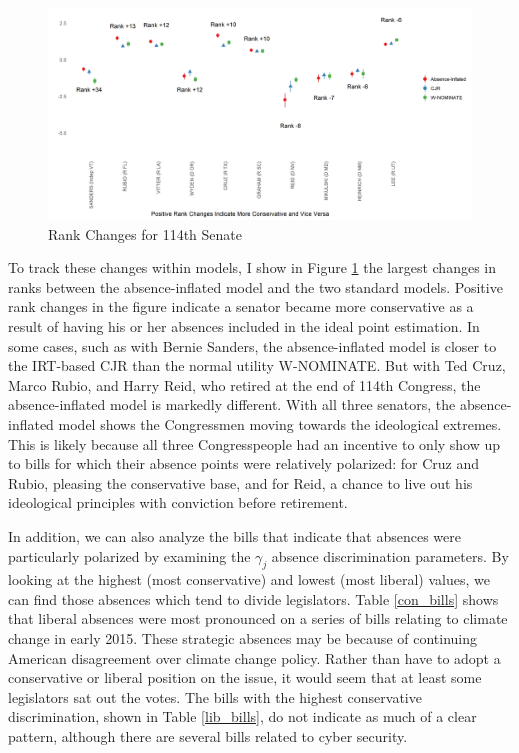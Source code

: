 	\begin{figure}
		\centering
		\caption{Rank Changes for 114th Senate}\label{rank_sen}
		\includegraphics[width=0.8\linewidth]{big_diff}
	\end{figure}
	
	To track these changes within models, I show in Figure \ref{rank_sen} the largest changes in ranks between the absence-inflated model and the two standard models. Positive rank changes in the figure indicate a senator became more conservative as a result of having his or her absences included in the ideal point estimation. In some cases, such as with Bernie Sanders, the absence-inflated model is closer to the IRT-based CJR than the normal utility W-NOMINATE. But with Ted Cruz, Marco Rubio, and Harry Reid, who retired at the end of 114th Congress, the absence-inflated model is markedly different. With all three senators, the absence-inflated model shows the Congressmen moving towards the ideological extremes. This is likely because all three Congresspeople had an incentive to only show up to bills for which their absence points were relatively polarized: for Cruz and Rubio, pleasing the conservative base, and for Reid, a chance to live out his ideological principles with conviction before retirement.
	
	In addition, we can also analyze the bills that indicate that absences were particularly polarized by examining the $\gamma_j$ absence discrimination parameters. By looking at the highest (most conservative) and lowest (most liberal) values, we can find those absences which tend to divide legislators. Table \ref{con_bills} shows that liberal absences were most pronounced on a series of bills relating to climate change in early 2015. These strategic absences may be because of continuing American disagreement over climate change policy. Rather than have to adopt a conservative or liberal position on the issue, it would seem that at least some legislators sat out the votes. The bills with the highest conservative discrimination, shown in Table \ref{lib_bills}, do not indicate as much of a clear pattern, although there are several bills related to cyber security.
	
